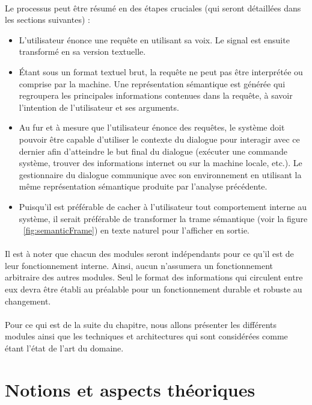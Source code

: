 \paragraph{}
Le processus peut être résumé en des étapes cruciales (qui seront détaillées dans les sections suivantes) : 
\begin{itemize}
	\label{spaLifeCycle}
	\item L'utilisateur énonce une requête en utilisant sa voix. Le signal est ensuite transformé en sa version textuelle.
	\item Étant sous un format textuel brut, la requête ne peut pas être interprétée ou comprise par la machine. Une représentation sémantique est générée qui regroupera les principales informations contenues dans la requête, à savoir l'intention de l'utilisateur et ses arguments.
	\item Au fur et à mesure que l'utilisateur énonce des requêtes, le système doit pouvoir être capable d'utiliser le contexte du dialogue pour interagir avec ce dernier afin d'atteindre le but final du dialogue (exécuter une commande système, trouver des informations internet ou sur la machine locale, etc.). Le gestionnaire du dialogue communique avec son environnement en utilisant la même représentation sémantique produite par l'analyse précédente.
	\item Puisqu'il est préférable de cacher à l'utilisateur tout comportement interne au système, il serait préférable de transformer la trame sémantique (voir la figure ~\ref{fig:semanticFrame}) en texte naturel pour l'afficher en sortie.
\end{itemize}
\paragraph{}
Il est à noter que chacun des modules seront indépendants pour ce qu'il est de leur fonctionnement interne. Ainsi, aucun n'assumera un fonctionnement arbitraire des autres modules. Seul le format des informations qui circulent entre eux devra être établi au préalable pour un fonctionnement durable et robuste au changement.
\paragraph{}
Pour ce qui est de la suite du chapitre, nous allons présenter les différents modules ainsi que les techniques et architectures qui sont considérées comme étant l'état de l'art du domaine. 

\section{Notions et aspects théoriques}
